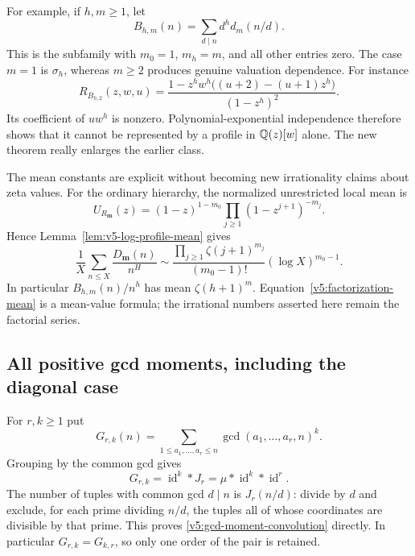 For example, if $h,m\geq1$, let
\[
 B_{h,m}(n)=\sum_{d\mid n}d^h d_m(n/d).
\]
This is the subfamily with $m_0=1$, $m_h=m$, and all other entries zero.
The case $m=1$ is $\sigma_h$, whereas $m\geq2$ produces genuine
valuation dependence.  For instance
\begin{equation}\label{v5:B-h-two-profile}
 R_{B_{h,2}}(z,w,u)=
 \frac{1-z^hw^h\bigl((u+2)-(u+1)z^h\bigr)}{(1-z^h)^2}.
\end{equation}
Its coefficient of $u w^h$ is nonzero.  Polynomial-exponential
independence therefore shows that it cannot be represented by a profile
in $\mathbb Q(z)[w]$ alone.  The new theorem really enlarges the earlier class.

The mean constants are explicit without becoming new irrationality
claims about zeta values.  For the ordinary hierarchy, the normalized
unrestricted local mean is
\[
 U_{R_{\mathbf m}}(z)
     =(1-z)^{1-m_0}\prod_{j\geq1}(1-z^{j+1})^{-m_j}.
\]
Hence Lemma~\ref{lem:v5-log-profile-mean} gives
\begin{equation}\label{v5:factorization-mean}
 \frac1X\sum_{n\leq X}\frac{D_{\mathbf m}(n)}{n^H}
 \sim\frac{\prod_{j\geq1}\zeta(j+1)^{m_j}}{(m_0-1)!}
                (\log X)^{m_0-1}.
\end{equation}
In particular $B_{h,m}(n)/n^h$ has mean $\zeta(h+1)^m$.
Equation~\eqref{v5:factorization-mean} is a mean-value formula; the
irrational numbers asserted here remain the factorial series.

\subsection{All positive gcd moments, including the diagonal case}

For $r,k\geq1$ put
\begin{equation}\label{v5:gcd-moment-definition}
 G_{r,k}(n)=\sum_{1\leq a_1,\ldots,a_r\leq n}
              \gcd(a_1,\ldots,a_r,n)^k.
\end{equation}
Grouping by the common gcd gives
\begin{equation}\label{v5:gcd-moment-convolution}
 G_{r,k}=\operatorname{id}^{k}*J_r
         =\mu*\operatorname{id}^{k}*\operatorname{id}^{r}.
\end{equation}
The number of tuples with common gcd $d\mid n$ is $J_r(n/d)$:
divide by $d$ and exclude, for each prime dividing $n/d$, the tuples
all of whose coordinates are divisible by that prime.  This proves
\eqref{v5:gcd-moment-convolution} directly.  In particular
$G_{r,k}=G_{k,r}$, so only one order of the pair is retained.

